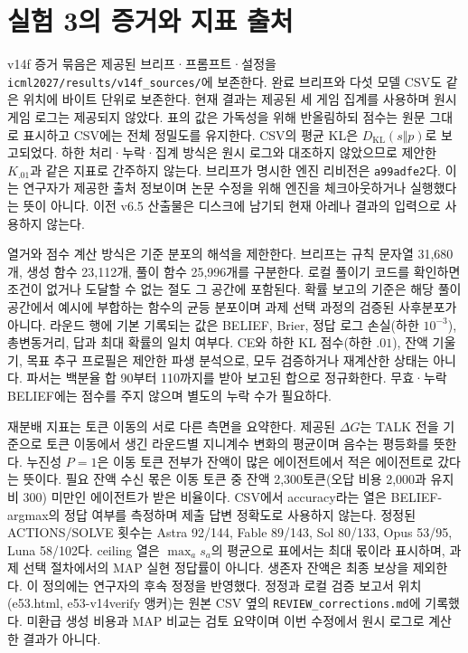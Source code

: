 
\FloatBarrier

\section{실험 3의 증거와 지표 출처}\label{app:arena-detail}
v14f 증거 묶음은 제공된 브리프·프롬프트·설정을 \texttt{icml2027/results/v14f\_sources/}에 보존한다. 완료 브리프와 다섯 모델 CSV도 같은 위치에 바이트 단위로 보존한다. 현재 결과는 제공된 세 게임 집계를 사용하며 원시 게임 로그는 제공되지 않았다. 표의 값은 가독성을 위해 반올림하되 점수는 원문 그대로 표시하고 CSV에는 전체 정밀도를 유지한다. CSV의 평균 KL은 $D_{\mathrm{KL}}(s\Vert p)$로 보고되었다. 하한 처리·누락·집계 방식은 원시 로그와 대조하지 않았으므로 제안한 $K_{.01}$과 같은 지표로 간주하지 않는다. 브리프가 명시한 엔진 리비전은 \texttt{a99adfe2}다. 이는 연구자가 제공한 출처 정보이며 논문 수정을 위해 엔진을 체크아웃하거나 실행했다는 뜻이 아니다. 이전 v6.5 산출물은 디스크에 남기되 현재 아레나 결과의 입력으로 사용하지 않는다.

열거와 점수 계산 방식은 기준 분포의 해석을 제한한다. 브리프는 규칙 문자열 31,680개, 생성 함수 23,112개, 풀이 함수 25,996개를 구분한다. 로컬 풀이기 코드를 확인하면 조건이 없거나 도달할 수 없는 절도 그 공간에 포함된다. 확률 보고의 기준은 해당 풀이 공간에서 예시에 부합하는 함수의 균등 분포이며 과제 선택 과정의 검증된 사후분포가 아니다. 라운드 행에 기본 기록되는 값은 BELIEF, Brier, 정답 로그 손실(하한 $10^{-3}$), 총변동거리, 답과 최대 확률의 일치 여부다. CE와 하한 KL 점수(하한 $.01$), 잔액 기울기, 목표 추구 프로필은 제안한 파생 분석으로, 모두 검증하거나 재계산한 상태는 아니다. 파서는 백분율 합 90부터 110까지를 받아 보고된 합으로 정규화한다. 무효·누락 BELIEF에는 점수를 주지 않으며 별도의 누락 수가 필요하다.

재분배 지표는 토큰 이동의 서로 다른 측면을 요약한다. 제공된 $\Delta G$는 TALK 전을 기준으로 토큰 이동에서 생긴 라운드별 지니계수 변화의 평균이며 음수는 평등화를 뜻한다. 누진성 $P=1$은 이동 토큰 전부가 잔액이 많은 에이전트에서 적은 에이전트로 갔다는 뜻이다. 필요 잔액 수신 몫은 이동 토큰 중 잔액 2,300토큰(오답 비용 2,000과 유지비 300) 미만인 에이전트가 받은 비율이다. CSV에서 accuracy라는 열은 BELIEF-argmax의 정답 여부를 측정하며 제출 답변 정확도로 사용하지 않는다. 정정된 ACTIONS/SOLVE 횟수는 Astra 92/144, Fable 89/143, Sol 80/133, Opus 53/95, Luna 58/102다. ceiling 열은 $\max_a s_a$의 평균으로 표에서는 최대 몫이라 표시하며, 과제 선택 절차에서의 MAP 실현 정답률이 아니다. 생존자 잔액은 최종 보상을 제외한다. 이 정의에는 연구자의 후속 정정을 반영했다. 정정과 로컬 검증 보고서 위치(e53.html, e53-v14verify 앵커)는 원본 CSV 옆의 \texttt{REVIEW\_corrections.md}에 기록했다. 미환급 생성 비용과 MAP 비교는 검토 요약이며 이번 수정에서 원시 로그로 계산한 결과가 아니다.

